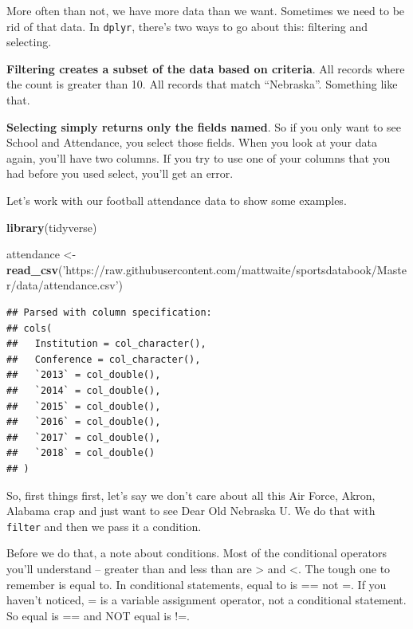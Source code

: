 \documentclass[]{book}
\newenvironment{Shaded}{\begin{snugshade}}{\end{snugshade}}
\newcommand{\KeywordTok}[1]{\textcolor[rgb]{0.13,0.29,0.53}{\textbf{#1}}}
\newcommand{\StringTok}[1]{\textcolor[rgb]{0.31,0.60,0.02}{#1}}
\newcommand{\NormalTok}[1]{#1}
\begin{document}
More often than not, we have more data than we want. Sometimes we need
to be rid of that data. In \texttt{dplyr}, there's two ways to go about
this: filtering and selecting.

\textbf{Filtering creates a subset of the data based on criteria}. All
records where the count is greater than 10. All records that match
``Nebraska''. Something like that.

\textbf{Selecting simply returns only the fields named}. So if you only
want to see School and Attendance, you select those fields. When you
look at your data again, you'll have two columns. If you try to use one
of your columns that you had before you used select, you'll get an
error.

Let's work with our football attendance data to show some examples.

\begin{Shaded}
\begin{Highlighting}[]
\KeywordTok{library}\NormalTok{(tidyverse)}
\end{Highlighting}
\end{Shaded}

\begin{Shaded}
\begin{Highlighting}[]
\NormalTok{attendance <-}\StringTok{ }\KeywordTok{read_csv}\NormalTok{(}\StringTok{'https://raw.githubusercontent.com/mattwaite/sportsdatabook/Master/data/attendance.csv'}\NormalTok{)}
\end{Highlighting}
\end{Shaded}

\begin{verbatim}
## Parsed with column specification:
## cols(
##   Institution = col_character(),
##   Conference = col_character(),
##   `2013` = col_double(),
##   `2014` = col_double(),
##   `2015` = col_double(),
##   `2016` = col_double(),
##   `2017` = col_double(),
##   `2018` = col_double()
## )
\end{verbatim}

So, first things first, let's say we don't care about all this Air
Force, Akron, Alabama crap and just want to see Dear Old Nebraska U. We
do that with \texttt{filter} and then we pass it a condition.

Before we do that, a note about conditions. Most of the conditional
operators you'll understand -- greater than and less than are
\textgreater{} and \textless{}. The tough one to remember is equal to.
In conditional statements, equal to is == not =. If you haven't noticed,
= is a variable assignment operator, not a conditional statement. So
equal is == and NOT equal is !=.
\end{document}
